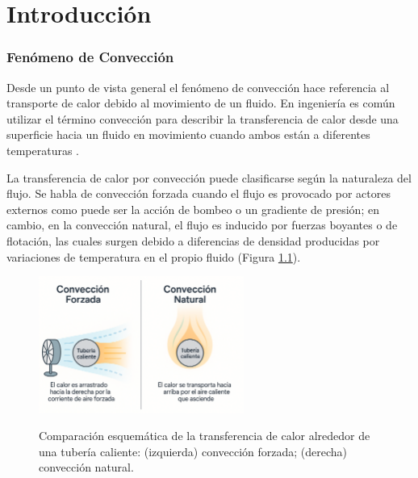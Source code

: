 \chapter{Introducción}
\label{cap:intro}


\subsection*{Fenómeno de Convección}

Desde un punto de vista general el fenómeno de convección hace referencia al transporte de calor debido al movimiento de un fluido. En ingeniería es común utilizar el término convección para describir la transferencia de calor desde una superficie hacia un fluido en movimiento cuando ambos están a diferentes temperaturas \cite{cengelheat,incropera}. 

La transferencia de calor por convección puede clasificarse según la naturaleza del flujo. Se habla de convección forzada cuando el flujo es provocado por actores externos como puede ser la acción de bombeo o un gradiente de presión; en cambio, en la convección natural, el flujo es inducido por fuerzas boyantes o de flotación, las cuales surgen debido a diferencias de densidad producidas por variaciones de temperatura en el propio fluido (Figura \ref{fig:natural_forzada}).

\begin{figure}[H]
 \centering
    \includegraphics[width=0.6\textwidth]{figures/cap1/natural_forzada.png}
    \label{fig:natural_forzada} 
 \caption{Comparación esquemática de la transferencia de calor alrededor de una tubería caliente: (izquierda) convección forzada; (derecha) convección natural.} 
 \label{fig:natural_forzada}
\end{figure}

